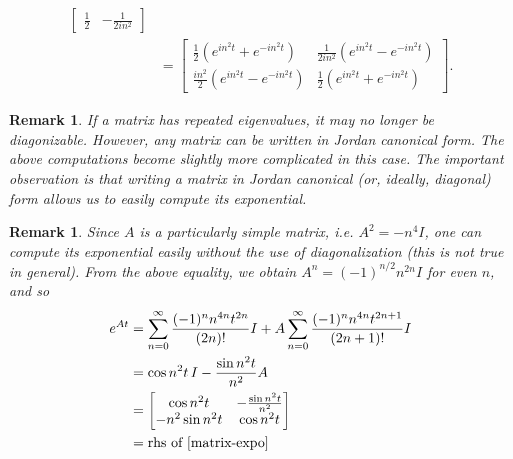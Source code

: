 \documentclass[12pt,reqno]{amsart}
\numberwithin{equation}{section}  %
\newtheorem{remark}[theorem]{Remark}
\begin{document}
\begin{appendices}
\begin{equation}
\begin{split}
\begin{bmatrix}
    \frac{1}{2} & -\frac{1}{2i n^{2} }
  \end{bmatrix}
  \\
  & =
  \begin{bmatrix}
    \frac{1}{2}(e^{in^{2}t} + e^{-in^{2}t}) & \frac{1}{2 i n^{2}} (e^{in^{2}t} -
    e^{-in^{2}t})    \\
    \frac{in^{2}}{2}(e^{in^{2}t} - e^{-in^{2}t}) & \frac{1}{2}(e^{in^{2}t} +
    e^{-in^{2}t})
  \end{bmatrix}.
\end{split}
\end{equation}
%
%
\begin{framed}
\begin{remark}
If a matrix has repeated eigenvalues, it may no longer be diagonizable. However,
any matrix can be written in Jordan canonical form. The above computations
become slightly more complicated in this case. The important observation is that
writing a matrix in Jordan canonical (or, ideally, diagonal) form allows us to
easily compute its exponential. 
\label{rem:jordan-form}
\end{remark}
\end{framed}
%
%
%
%
\begin{framed}
\begin{remark}
\label{rem:simpler-comp}
  Since $A$ is a particularly simple matrix, i.e. $A^{2} = -n^{4} I$, one can
  compute its exponential easily without the use of diagonalization (this is
  not true in general). From the above equality, we obtain $A^{n} =
  (-1)^{n/2} n^{2n} I$ for even $n$, and so
  \begin{equation*}
  \begin{split}
    e^{At}
    & = \sum_{n=0}^{\infty} \frac{(-1)^{n}n^{4n}t^{2n}}{(2n)!}I + A
    \sum_{n=0}^{\infty} \frac{(-1)^{n} n^{4n} t^{2n + 1}}{(2n + 1)!} I 
    \\
    & = \cos n^{2}t \, I - \frac{\sin n^{2}t}{n^{2}}A
    \\
    & = 
    \begin{bmatrix}
      \cos n^{2}t &  -\frac{\sin n^{2}t}{n^{2}}
      \\
      - n^{2} \sin n^{2}t & \cos n^{2}t
    \end{bmatrix}
    \\
    & = \text{rhs of }\eqref{matrix-expo}
  \end{split}
  \end{equation*}
\end{remark}
\end{framed}

\end{appendices}
\end{document}
